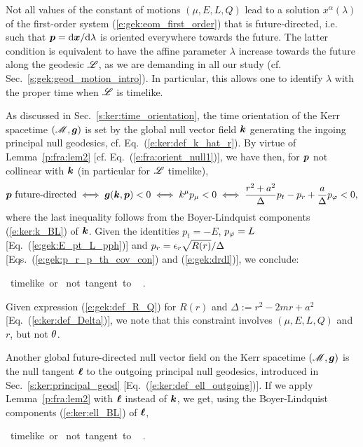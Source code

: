 Not all values of the constant of motions $(\mu,E,L,Q)$ lead to a solution
$x^\alpha(\lambda)$ of the first-order system (\ref{e:gek:eom_first_order})
that is future-directed, i.e. such that $\bm{p} = \mathrm{d} \bm{x}/\mathrm{d}\lambda$
is oriented everywhere towards the future.
The latter condition is equivalent to have the affine parameter $\lambda$ increase
towards the future along the geodesic $\mathscr{L}$, as we are demanding in all
our study (cf. Sec.~\ref{s:gek:geod_motion_intro}).
In particular, this allows one to identify $\lambda$ with the proper
time when $\mathscr{L}$ is timelike.


As discussed in Sec.~\ref{s:ker:time_orientation}, the time orientation of
the Kerr spacetime $(\mathscr{M},\bm{g})$ is set by the global null
vector field $\bm{k}$ generating the ingoing principal null geodesics, cf. Eq.~(\ref{e:ker:def_k_hat_r}).
By virtue of Lemma~\ref{p:fra:lem2}
[cf. Eq.~(\ref{e:fra:orient_null1})], we have then, for $\bm{p}$ not collinear
with $\bm{k}$ (in particular for $\mathscr{L}$ timelike),
\[
    \bm{p} \ \mbox{future-directed} \iff \bm{g}(\bm{k},\bm{p}) < 0
    \iff k^\mu p_\mu < 0
    \iff \frac{r^2 + a^2}{\Delta} p_t - p_r + \frac{a}{\Delta} p_\varphi < 0 ,
\]
where the last inequality follows from the Boyer-Lindquist components
(\ref{e:ker:k_BL}) of $\bm{k}$.
Given the identities $p_t = -E$, $p_\varphi = L$
[Eq.~(\ref{e:gek:E_pt_L_pph})] and $p_r = \epsilon_r \sqrt{R(r)}/ \Delta $
[Eqs.~(\ref{e:gek:p_r_p_th_cov_con})
and (\ref{e:gek:drdl})], we conclude:
\begin{prop}
\be \label{e:gek:future_directed}
{\Li \ \mbox{timelike or}\atop
{} \ \mbox{not tangent to} \ \Li} \implies
{} .
\ee
\end{prop}
Given expression (\ref{e:gek:def_R_Q}) for $R(r)$ and
$\Delta := r^2 - 2m r + a^2$ [Eq.~(\ref{e:ker:def_Delta})],
we note that this constraint involves $(\mu,E,L,Q)$ and $r$, but not $\theta$.

Another global future-directed null vector field on the Kerr spacetime $(\mathscr{M},\bm{g})$ is the null tangent
$\bm{\ell}$ to the outgoing principal null geodesics, introduced in Sec.~\ref{s:ker:principal_geod} [Eq.~(\ref{e:ker:def_ell_outgoing})]. If we apply Lemma~\ref{p:fra:lem2}  with $\bm{\ell}$ instead
of $\bm{k}$, we get, using the Boyer-Lindquist components (\ref{e:ker:ell_BL}) of $\bm{\ell}$,
\begin{prop}
\be \label{e:gek:future_directed_l}
{\Li \ \mbox{timelike or}\atop
\wl \ \mbox{not tangent to} \ \Li} \implies
{} .
\ee
\end{prop}

